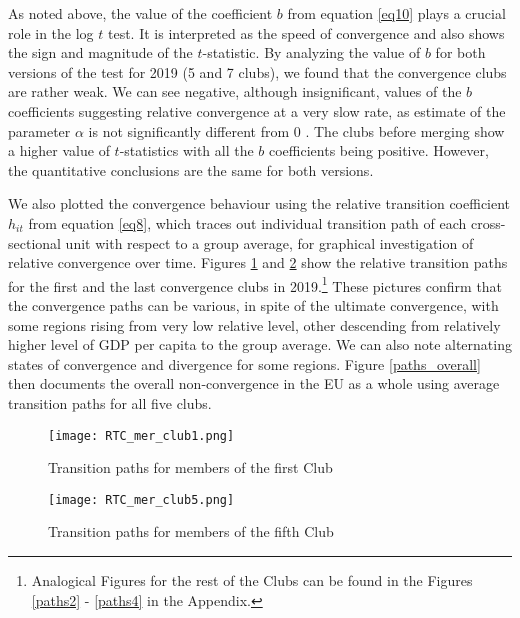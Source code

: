 \documentclass[11pt]{article}
\begin{document}
As noted above, the value of the coefficient $b$ from equation \ref{eq10} plays a crucial role in the log $t$ test. It is interpreted as the speed of convergence and also shows the sign and magnitude of the $t$-statistic. By analyzing the value of $b$ for both versions of the test for 2019 (5 and 7 clubs), we found that the convergence clubs are rather weak. We can see negative, although insignificant, values of the $b$ coefficients suggesting relative convergence at a very slow rate, as estimate of the parameter $\alpha$ is not significantly different from 0 \citep{phillips2007transition}. The clubs before merging show a higher value of $t$-statistics with all the $b$ coefficients being positive. However, the quantitative conclusions are the same for both versions.

We also plotted the convergence behaviour using the relative transition coefficient $h_{it}$ from equation \ref{eq8}, which traces out individual transition path of each cross-sectional unit with respect to a group average, for graphical investigation of relative convergence over time. Figures \ref{paths1} and \ref{paths5} show the relative transition paths for the first and the last convergence clubs in 2019.\footnote{Analogical Figures for the rest of the Clubs can be found in the Figures \ref{paths2} - \ref{paths4} in the Appendix.} These pictures confirm that the convergence paths can be various, in spite of the ultimate convergence, with some regions rising from very low relative level, other descending from relatively higher level of GDP per capita to the group average. We can also note alternating states of convergence and divergence for some regions. Figure \ref{paths_overall} then documents the overall non-convergence in the EU as a whole using average transition paths for all five clubs.

\begin{figure}[!htbp]%
    \centering
    \texttt{[image: RTC\_mer\_club1.png]}
    \caption{Transition paths for members of the first Club}
    \label{paths1}
\end{figure}

\begin{figure}[!htbp]%
    \centering
    \texttt{[image: RTC\_mer\_club5.png]}
    \caption{Transition paths for members of the fifth Club }
    \label{paths5}
\end{figure}
\end{document}
